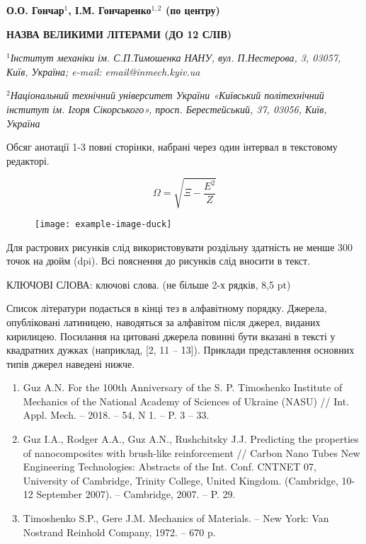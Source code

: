 \documentclass[a4paper,10pt]{article}
\begin{document}
\pagestyle{empty}
\begin{center}
\textbf{О.О. Гончар$^1$, І.М. Гончаренко$^{1,2}$ (по центру)}
\bigskip

\textbf{НАЗВА ВЕЛИКИМИ ЛІТЕРАМИ (ДО 12 СЛІВ)}
\bigskip

\textit{\fontsize{9}{9}\selectfont$^1$Інститут механіки ім. С.П.Тимошенка НАНУ,
вул. П.Нестерова, 3, 03057, Київ, Україна;
e-mail: email@inmech.kyiv.ua}

\textit{\fontsize{9}{9}\selectfont$^2$Національний технічний університет України
«Київський політехнічний інститут ім. Ігоря Сікорського»,
просп. Берестейський, 37, 03056, Київ, Україна}                                        \end{center}


Обсяг анотації 1-3 повні сторінки, набрані через один інтервал в текстовому редакторі.

\begin{equation}
 \Omega=\sqrt{\Xi-\dfrac{E^2}{Z}}
\end{equation}


\begin{figure}[ht]
\centering
\texttt{[image: example-image-duck]}
\caption{}\label{example}
\end{figure}

Для растрових рисунків слід використовувати роздільну здатність не менше 300 точок на дюйм (dpi). Всі пояснення до рисунків слід вносити в текст.
\bigskip

{\fontsize{8.5}{8.5}\selectfont
КЛЮЧОВІ СЛОВА: ключові слова. (не більше 2-х рядків, 8,5 pt)}
\bigskip

Список літератури подається в кінці тез в алфавітному порядку. Джерела, опубліковані латиницею, наводяться за алфавітом після джерел, виданих кирилицею. Посилання на цитовані джерела повинні бути вказані в тексті у квадратних дужках (наприклад, [2, 11 – 13]). Приклади представлення основних типів джерел наведені нижче.
{\fontsize{8.5}{8.5}\selectfont
\begin{enumerate}
 \item Guz A.N. For the 100th Anniversary of the S. P. Timoshenko Institute of Mechanics of the National Academy of Sciences of Ukraine (NASU) // Int. Appl. Mech. – 2018. – 54, N 1. – P. 3 – 33.
 \item Guz I.A., Rodger A.A., Guz A.N., Rushchitsky J.J. Predicting the properties of nano\-composites with brush-like reinforcement // Carbon Nano Tubes New Engineering Tech\-no\-logies: Abstracts of the Int. Conf. CNTNET 07, University of Cambridge, Trinity College, United Kingdom. (Cambridge, 10-12 September 2007). – Cambridge, 2007. – P. 29.
 \item Timoshenko S.P., Gere J.M. Mechanics of Materials. – New York: Van Nostrand Reinhold Company, 1972. – 670 p.
\end{enumerate}
}
\end{document}
